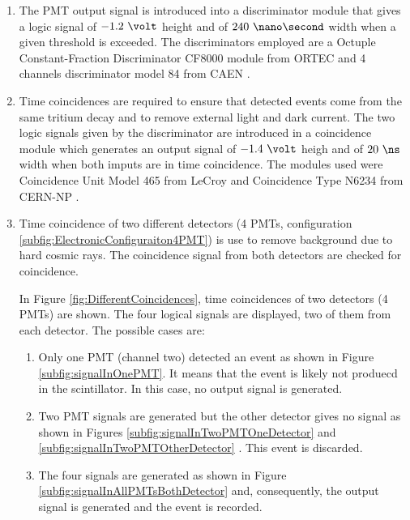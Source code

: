 \begin{enumerate}
\begin{enumerate}

\item{} The PMT output signal is introduced into a discriminator module that gives a logic signal of $-1.2~\volt$ height and of $240~\nano\second$ width when a given threshold is exceeded. The discriminators employed are a Octuple Constant-Fraction Discriminator CF8000 module from ORTEC \cite{DataSheetDiscriminator} and 4 channels discriminator model 84 from CAEN \cite{DataSheetDiscriminatorCAEN}.

\item{} Time coincidences are required to ensure that detected events come from the same tritium decay and to remove external light and dark current. The two logic signals given by the discriminator are introduced in a coincidence module which generates an output signal of $-1.4~\volt$ heigh and of $20~\ns$ width when both imputs are in time coincidence. The modules used were Coincidence Unit Model 465 from LeCroy \cite{DataSheetCoincidenceLeCroy} and Coincidence Type N6234 from CERN-NP \cite{DataSheetCoincidenceCERN}.

\item{} Time coincidence of two different detectors (4 PMTs, configuration \ref{subfig:ElectronicConfiguraiton4PMT}) is use to remove background due to hard cosmic rays. The coincidence signal from both detectors are checked for coincidence.

In Figure \ref{fig:DifferentCoincidences}, time coincidences of two detectors (4 PMTs) are shown. The four logical signals are displayed, two of them from each detector. The possible cases are:

\begin{enumerate}
\item{} Only one PMT (channel two) detected an event as shown in Figure \ref{subfig:signalInOnePMT}. It means that the event is likely not produecd in the scintillator. In this case, no output signal is generated.

\item{} Two PMT signals are generated but the other detector gives no signal as shown in Figures \ref{subfig:signalInTwoPMTOneDetector} and \ref{subfig:signalInTwoPMTOtherDetector} . This event is discarded.

\item{} The four signals are generated as shown in Figure \ref{subfig:signalInAllPMTsBothDetector}  and, consequently, the output signal is generated and the event is recorded.


\end{enumerate}
\end{enumerate}
\end{enumerate}
